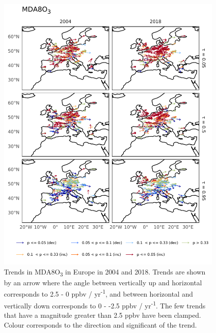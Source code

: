 \documentclass{article}
\begin{document}
\begin{figure}[p]
\centering
\includegraphics[height=0.9\textheight]{figures/si_figures/fS05_o3_map_mda8_all_eu_o3.pdf}
\caption{Trends in MDA8O\textsubscript{3} in Europe in 2004 and 2018. Trends are shown by an arrow where the angle between vertically up and horizontal corresponds to 2.5 - 0 ppbv / yr\textsuperscript{-1}, and between horizontal and vertically down corresponds to 0 - -2.5 ppbv / yr\textsuperscript{-1}. The few trends that have a magnitude greater than 2.5 ppbv have been clamped. Colour corresponds to the direction and significant of the trend.}
\label{si_fig:o3_map_eu_mda8}
\end{figure}
\clearpage
\end{document}
